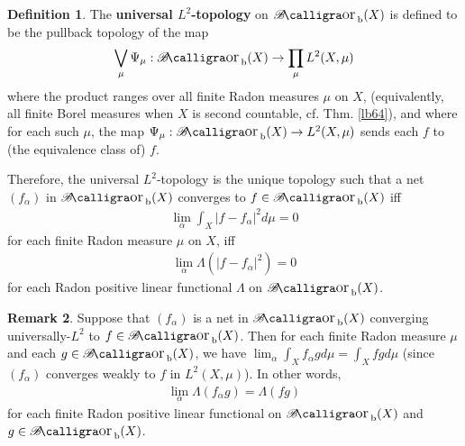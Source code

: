 \documentclass[12pt,b5paper,notitlepage]{article}
\theoremstyle{definition}
\newtheorem{df}{Definition}[subsection]
\newtheorem{rem}[df]{Remark}
\theoremstyle{plain}
\DeclareMathOperator{\Borb}{{\mathscr{B}\text{\kern -2pt {\calligra\large or}}\,}_{\mathrm b}}
\newcommand{\hqed}{\hfill\qedsymbol}
\numberwithin{equation}{section}
\begin{document}
\begin{df}
The \textbf{universal $L^2$-topology}  on $\Borb(X)$ is defined to be the pullback topology of the map
\begin{align*}
\bigvee_\mu \Psi_\mu:\Borb(X)\rightarrow \prod_\mu L^2(X,\mu)
\end{align*}
where the product ranges over all finite Radon measures $\mu$ on $X$, (equivalently, all finite Borel measures when $X$ is second countable, cf. Thm. \ref{lb64}), and where for each such $\mu$, the map $\Psi_\mu:\Borb(X)\rightarrow L^2(X,\mu)$ sends each $f$ to (the equivalence class of) $f$.

Therefore, the universal $L^2$-topology is the unique topology such that a net $(f_\alpha)$ in $\Borb(X)$ converges to $f\in\Borb(X)$ iff
\begin{align*}
\lim_\alpha \int_X|f-f_\alpha|^2d\mu=0
\end{align*}
for each finite Radon measure $\mu$ on $X$, iff
\begin{align*}
\lim_\alpha\Lambda(|f-f_\alpha|^2)=0
\end{align*}
for each Radon positive linear functional $\Lambda$ on $\Borb(X)$. \hqed
\end{df}

\begin{rem}\label{lb277}
Suppose that $(f_\alpha)$ is a net in $\Borb(X)$ converging universally-$L^2$ to $f\in\Borb(X)$. Then for each finite Radon measure $\mu$ and each $g\in\Borb(X)$, we have $\lim_\alpha\int_X f_\alpha g d\mu=\int_Xf gd\mu$ (since $(f_\alpha)$ converges weakly to $f$ in $L^2(X,\mu)$). In other words,
\begin{align}
\lim_\alpha\Lambda(f_\alpha g)=\Lambda(fg)
\end{align}
for each finite Radon positive linear functional on $\Borb(X)$ and $g\in\Borb(X)$. 
\end{rem}
\end{document}
